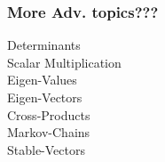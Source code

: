 \documentclass{beamer}
\begin{document}
\begin{frame}
\frametitle{More Adv. topics???}
\begin{description}

\item Determinants\\
Scalar Multiplication\\
Eigen-Values\\
Eigen-Vectors\\
Cross-Products\\
Markov-Chains\\
Stable-Vectors\\
\end{description}

\end{frame}



\end{document}
